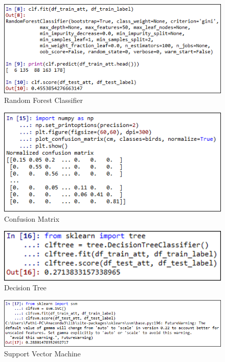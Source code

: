\begin{figure}[ht]
	\centerline{\includegraphics[width=1\textwidth]{figures/fathi/chapter3/hari2/4.png}}
	\caption{Random Forest Classifier}
	\label{p1}
\end{figure}

\begin{figure}[ht]
	\centerline{\includegraphics[width=1\textwidth]{figures/fathi/chapter3/hari2/5.png}}
	\caption{Confusion Matrix}
	\label{p2}
\end{figure}

\begin{figure}[ht]
	\centerline{\includegraphics[width=1\textwidth]{figures/fathi/chapter3/hari2/6.png}}
	\caption{Decision Tree}
	\label{p3}
\end{figure}

\begin{figure}[ht]
	\centerline{\includegraphics[width=1\textwidth]{figures/fathi/chapter3/hari2/7.png}}
	\caption{Support Vector Machine}
	\label{p4}
\end{figure}

